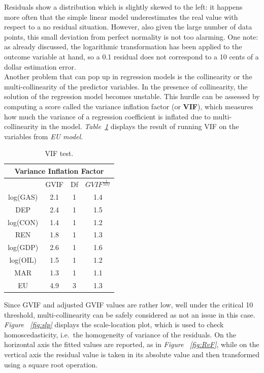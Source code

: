 \documentclass[a4paper,12pt]{book}
\begin{document}
Residuals show a distribution which is slightly skewed to the left: it happens more often that the simple linear model underestimates the real value with respect to a no residual situation. However, also given the large number of data points, this small deviation from perfect normality is not too alarming. One note: as already discussed, the logarithmic transformation has been applied to the outcome variable at hand, so a 0.1 residual does not correspond to a 10 cents of a dollar estimation error.\\

Another problem that can pop up in regression models is the collinearity or the multi-collinearity of the predictor variables. In the presence of collinearity, the solution of the regression model becomes unstable. This hurdle can be assessed by computing a score called the variance inflation factor (or \textbf{VIF}), which measures how much the variance of a regression coefficient is inflated due to multi-collinearity in the model. \textit{Table~\ref{Tab:vif}} displays the result of running VIF on the variables from \textit{EU model}.

\begin{table}[tb]
\begin{center}
\begin{tabular}{|c|c|c|c|}
\hline
\multicolumn{4}{|c|}{Variance Inflation Factor}\\
\hline
&GVIF&Df&$GVIF^{\frac{1}{2Df}}$\\
\hline
log(GAS)&2.1&1&1.4\\
DEP&2.4&1&1.5\\
log(CON)&1.4&1&1.2\\
REN&1.8&1&1.3\\
log(GDP)&2.6&1&1.6\\
log(OIL)&1.5&1&1.2\\
MAR&1.3&1&1.1\\
EU&4.9&3&1.3\\
\hline
\end{tabular}
\caption{VIF test.}
\label{Tab:vif}
\end{center}
\end{table}

Since GVIF and adjusted GVIF values are rather low, well under the critical 10 threshold, multi-collinearity can be safely considered as not an issue in this case.\\

\textit{Figure ~\ref{fig:slp}} displays the scale-location plot, which is used to check homoscedasticity, i.e.\ the homogeneity of variance of the residuals. On the horizontal axis the fitted values are reported, as in \textit{Figure ~\ref{fig:RvF}}, while on the vertical axis the residual value is taken in its absolute value and then transformed using a square root operation.
\end{document}
